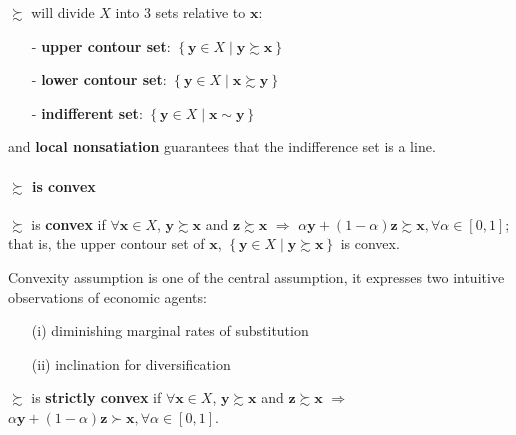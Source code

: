 $\succsim$ will divide $X$ into 3 sets relative to $\mathbf{x}$:
\begin{enumerate}
    \item[-] \textbf{upper contour set}: $\left\{\mathbf{y}\in X\mid \mathbf{y}\succsim \mathbf{x} \right\}$  
    \item[-] \textbf{lower contour set}: $\left\{\mathbf{y}\in X \mid \mathbf{x}\succsim \mathbf{y}\right\}$ 
    \item[-] \textbf{indifferent set}: $\left\{\mathbf{y}\in X \mid \mathbf{x}\sim \mathbf{y}\right\}$ 
\end{enumerate}
and \textbf{local nonsatiation} guarantees that the indifference set is a line.

\paragraph*{$\succsim$ is convex}
$\succsim$ is \textbf{convex} if $\forall \mathbf{x}\in X$, $\mathbf{y}\succsim\mathbf{x}$ and $\mathbf{z}\succsim\mathbf{x}$ $\Rightarrow$ $\alpha \mathbf{y}+(1-\alpha)\mathbf{z}\succsim \mathbf{x},\forall \alpha \in [0,1]$; that is, the upper contour set of $\mathbf{x}$, $\left\{\mathbf{y}\in X\mid \mathbf{y}\succsim \mathbf{x} \right\}$ is convex.

Convexity assumption is one of the central assumption, it expresses two intuitive observations of economic agents:
\begin{enumerate}
    \item[(i)] diminishing marginal rates of substitution
    \item[(ii)] inclination for diversification  
\end{enumerate}

$\succsim$ is \textbf{strictly convex} if $\forall \mathbf{x}\in X$, $\mathbf{y}\succsim\mathbf{x}$ and $\mathbf{z}\succsim\mathbf{x}$ $\Rightarrow$ $\alpha \mathbf{y}+(1-\alpha)\mathbf{z}\succ \mathbf{x},\forall \alpha \in [0,1]$.

